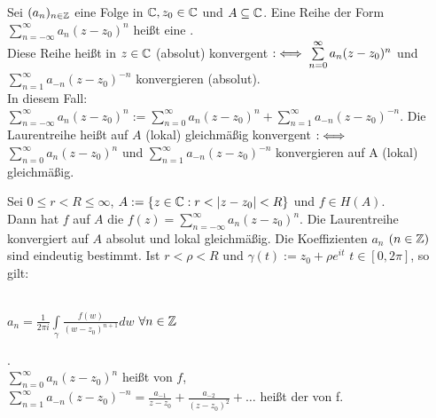 \documentclass[a4paper,twoside,DIV15,BCOR12mm]{scrbook}
\def\gdw{\equizu}
\def\gdw{\equizu}
\begin{document}
\begin{definition}
Sei $(a_n)_{n \in \mathbb{Z}}$ eine Folge in $\mathbb{C}, z_0 \in \mathbb{C}$ und $A \subseteq
\mathbb{C}$. Eine Reihe der Form $\sum\limits_{n=-\infty}^{\infty} a_n(z-z_0)^n$ heißt eine
. \\
Diese Reihe heißt in $z \in \mathbb{C}$ (absolut) konvergent $: \gdw
\sum\limits_{n=0}^{\infty} a_n(z-z_0)^n$  und $\sum\limits_{n=1}^{\infty}
a_{-n}(z-z_0)^{-n}$ konvergieren (absolut). \\ In diesem Fall: $\sum\limits_{n=-\infty}^{\infty}
a_n(z-z_0)^n := \sum\limits_{n=0}^{\infty} a_n(z-z_0)^n + \sum\limits_{n=1}^{\infty}
a_{-n}(z-z_0)^{-n}$. Die Laurentreihe heißt auf $A$ (lokal) gleichmäßig
konvergent $:\gdw$ $\sum\limits_{n=0}^{\infty} a_n(z-z_0)^n$ und $\sum\limits_{n=1}^{\infty}
a_{-n}(z-z_0)^{-n}$ konvergieren auf A (lokal) gleichmäßig.
\end{definition}

\begin{satz}
Sei $0 \leq r < R \leq \infty$, $A := \{z \in \mathbb{C}: r < |z-z_0| < R\}$ und $f
\in H(A).$ \\Dann hat $f$ auf $A$ die  
$f(z) = \sum\limits_{n=-\infty}^{\infty} a_n(z-z_0)^n$. Die Laurentreihe
konvergiert auf $A$ absolut und lokal gleichmäßig. Die Koeffizienten $a_n$ $(n
\in \mathbb{Z} )$ sind eindeutig bestimmt. Ist $r < \rho < R$ und $\gamma(t) := z_0 +
\rho e^{it}$ $t \in [0,2\pi]$, so gilt: \\ \\
\centerline{$a_n = \frac{1}{2\pi i} \int\limits_{\gamma} 
\frac{f(w)}{(w-z_0)^{n+1}} dw$ $\forall n \in \mathbb{Z}$}. \\
$\sum\limits_{n=0}^{\infty} a_n(z-z_0)^n$ heißt  von $f$, \\
$\sum\limits_{n=1}^{\infty} a_{-n}(z-z_0)^{-n} = \frac{a_{-1}}{z-z_0}+
\frac{a_{-2}}{(z-z_0)^2} + \ldots$ heißt der  von f.
\end{satz}
\end{document}
